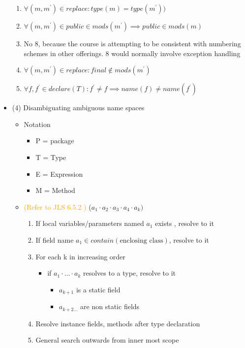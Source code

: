 \documentclass{article}
\begin{document}
\begin{itemize}
\begin{enumerate}
\item \(\forall(m, m^\prime) \in replace: type(m) = type(m^\prime))\)
\item \(\forall(m, m^\prime) \in public \in mods(m^\prime) \implies public \in mods(m)\)
\item No 8, because the course is attempting to be consistent with numbering schemes in other offerings. 8 would normally involve exception handling
\item \(\forall(m, m^\prime) \in replace: final \not\in mods(m^\prime) \)
\item \(\forall f, f^\prime \in declare(T) : f^\prime \neq f \implies name(f)\neq name(f^\prime) \)
\end{enumerate}
\item (4) Disambiguating ambiguous name spaces
\begin{itemize}
\item Notation 
\begin{itemize}
\item P = package
\item T  = Type
\item E = Expression 
\item M = Method
\end{itemize}
\item \textcolor{orange}{(Refer to JLS 6.5.2 )}  (\(a_1 \cdot a_2 \cdot a_3 \cdot a_4 \cdot a_k ) \)
\begin{enumerate}
\item If local variables/parameters named \(a_1\) exists , resolve to it
\item If field name \(a_1 \in contain( \text{enclosing class})\), resolve to it
\item For each k in increasing order
\begin{itemize}
\item if \(a_1 \cdot \ldots \cdot a_k\) resolves to a type, resolve to it 
\begin{itemize}
\item  \(a_{k+1}\) is a static field
\item \(a_{k+2 \ldots}\) are non static fields
\end{itemize}
\end{itemize}
\item Resolve instance fields, methods after type declaration
\item General search outwards from inner most scope
\end{enumerate}
\end{itemize}
\end{itemize}
\end{document}
